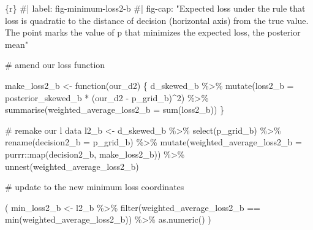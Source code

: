 \documentclass[
  letterpaper,
  DIV=11,
  numbers=noendperiod]{scrreprt}
\newenvironment{Shaded}{\begin{snugshade}}{\end{snugshade}}
\newcommand{\AttributeTok}[1]{\textcolor[rgb]{0.40,0.45,0.13}{#1}}
\newcommand{\CommentTok}[1]{\textcolor[rgb]{0.37,0.37,0.37}{#1}}
\newcommand{\ControlFlowTok}[1]{\textcolor[rgb]{0.00,0.23,0.31}{#1}}
\newcommand{\DecValTok}[1]{\textcolor[rgb]{0.68,0.00,0.00}{#1}}
\newcommand{\FunctionTok}[1]{\textcolor[rgb]{0.28,0.35,0.67}{#1}}
\newcommand{\InformationTok}[1]{\textcolor[rgb]{0.37,0.37,0.37}{#1}}
\newcommand{\NormalTok}[1]{\textcolor[rgb]{0.00,0.23,0.31}{#1}}
\newcommand{\OtherTok}[1]{\textcolor[rgb]{0.00,0.23,0.31}{#1}}
\newcommand{\SpecialCharTok}[1]{\textcolor[rgb]{0.37,0.37,0.37}{#1}}
\begin{document}
\begin{Shaded}
\begin{Highlighting}[]
\InformationTok{\textasciigrave{}\textasciigrave{}\textasciigrave{}\{r\}}
\CommentTok{\#| label: fig{-}minimum{-}loss2{-}b}
\CommentTok{\#| fig{-}cap: "Expected loss under the rule that loss is quadratic to the distance of decision (horizontal axis) from the true value. The point marks the value of \textasciigrave{}p\textasciigrave{} that minimizes the expected loss, the posterior mean"}

\CommentTok{\# amend our loss function}

\NormalTok{make\_loss2\_b }\OtherTok{\textless{}{-}} \ControlFlowTok{function}\NormalTok{(our\_d2) \{}
\NormalTok{  d\_skewed\_b }\SpecialCharTok{\%\textgreater{}\%} 
    \FunctionTok{mutate}\NormalTok{(}\AttributeTok{loss2\_b =}\NormalTok{ posterior\_skewed\_b }\SpecialCharTok{*}\NormalTok{ (our\_d2 }\SpecialCharTok{{-}}\NormalTok{ p\_grid\_b)}\SpecialCharTok{\^{}}\DecValTok{2}\NormalTok{) }\SpecialCharTok{\%\textgreater{}\%} 
    \FunctionTok{summarise}\NormalTok{(}\AttributeTok{weighted\_average\_loss2\_b =} \FunctionTok{sum}\NormalTok{(loss2\_b))}
\NormalTok{\}}


\CommentTok{\# remake our \textasciigrave{}l\textasciigrave{} data}
\NormalTok{l2\_b }\OtherTok{\textless{}{-}}
\NormalTok{  d\_skewed\_b }\SpecialCharTok{\%\textgreater{}\%} 
  \FunctionTok{select}\NormalTok{(p\_grid\_b) }\SpecialCharTok{\%\textgreater{}\%} 
  \FunctionTok{rename}\NormalTok{(}\AttributeTok{decision2\_b =}\NormalTok{ p\_grid\_b) }\SpecialCharTok{\%\textgreater{}\%} 
  \FunctionTok{mutate}\NormalTok{(}\AttributeTok{weighted\_average\_loss2\_b =}\NormalTok{ purrr}\SpecialCharTok{::}\FunctionTok{map}\NormalTok{(decision2\_b, make\_loss2\_b)) }\SpecialCharTok{\%\textgreater{}\%} 
  \FunctionTok{unnest}\NormalTok{(weighted\_average\_loss2\_b)}

\CommentTok{\# update to the new minimum loss coordinates}

\NormalTok{(}
\NormalTok{    min\_loss2\_b }\OtherTok{\textless{}{-}}
\NormalTok{      l2\_b }\SpecialCharTok{\%\textgreater{}\%} 
      \FunctionTok{filter}\NormalTok{(weighted\_average\_loss2\_b }\SpecialCharTok{==} \FunctionTok{min}\NormalTok{(weighted\_average\_loss2\_b)) }\SpecialCharTok{\%\textgreater{}\%} 
      \FunctionTok{as.numeric}\NormalTok{()}
\NormalTok{)}


\end{Highlighting}
\end{Shaded}
\end{document}
